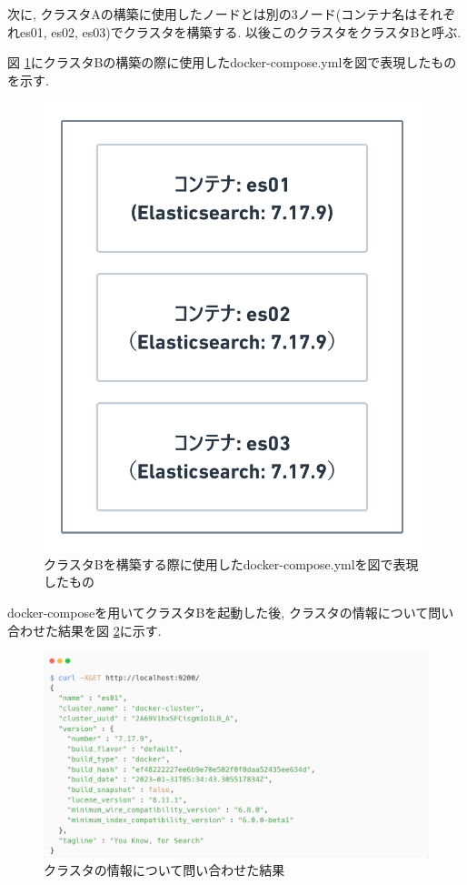次に, クラスタAの構築に使用したノードとは別の3ノード(コンテナ名はそれぞれes01, es02, es03)でクラスタを構築する. 以後このクラスタをクラスタBと呼ぶ.

図 \ref{4-p10}にクラスタBの構築の際に使用したdocker-compose.ymlを図で表現したものを示す.

\begin{figure}[H]
  \begin{center}
    \includegraphics[width=110mm]{sotu/figure/all-7.19.9.png}
    \caption{クラスタBを構築する際に使用したdocker-compose.ymlを図で表現したもの}
    \label{4-p10}
  \end{center}
\end{figure}

docker-composeを用いてクラスタBを起動した後, クラスタの情報について問い合わせた結果を図 \ref{4-p11}に示す.

\begin{figure}[H]
  \begin{center}
    \includegraphics[width=140mm]{sotu/figure/3nodes-cluster.png}
    \caption{クラスタの情報について問い合わせた結果}
    \label{4-p11}
  \end{center}
\end{figure}

